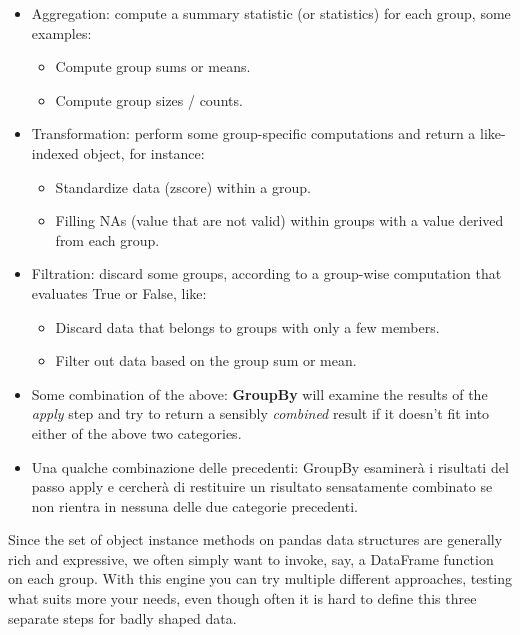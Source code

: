 \begin{itemize}
    \item Aggregation: compute a summary statistic (or statistics) for each group, some examples:
          \begin{itemize}
              \item Compute group sums or means.
              \item Compute group sizes / counts.
          \end{itemize}
    \item Transformation: perform some group-specific computations and return a like-indexed object, for instance:
          \begin{itemize}
              \item Standardize data (zscore) within a group.
              \item Filling NAs (value that are not valid) within groups with a value derived from each group.
          \end{itemize}
    \item Filtration: discard some groups, according to a group-wise computation that evaluates True or False, like:
          \begin{itemize}
              \item Discard data that belongs to groups with only a few members.
              \item Filter out data based on the group sum or mean.
          \end{itemize}
    \item Some combination of the above: \textbf{GroupBy} will examine the results of the \textit{apply} step and try to return a sensibly \textit{combined} result if it doesn't fit into either of the above two categories.
    \item Una qualche combinazione delle precedenti: GroupBy esaminerà i risultati del passo apply e cercherà di restituire un risultato sensatamente combinato se non rientra in nessuna delle due categorie precedenti.
\end{itemize}
Since the set of object instance methods on pandas data structures are generally rich and expressive, we often simply want to invoke, say, a DataFrame function on each group.
With this engine you can try multiple different approaches, testing what suits more your needs, even though often it is hard to define this three separate steps for badly shaped data.

